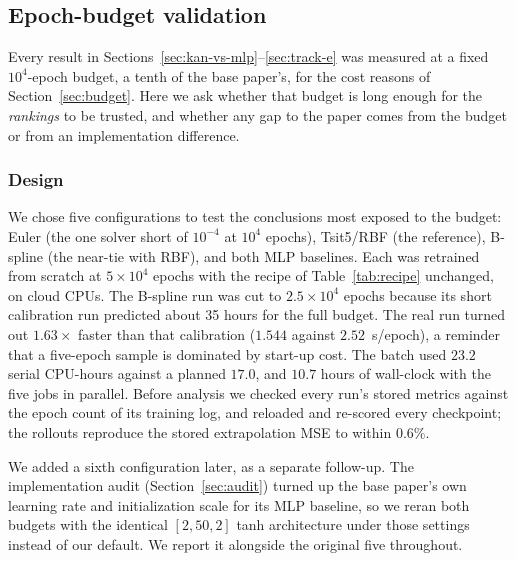 \subsection{Epoch-budget validation}
\label{sec:phase4}

Every result in Sections~\ref{sec:kan-vs-mlp}--\ref{sec:track-e} was measured
at a fixed $10^4$-epoch budget, a tenth of the base paper's, for the cost
reasons of Section~\ref{sec:budget}. Here we ask whether that budget is long
enough for the \emph{rankings} to be trusted, and whether any gap to the
paper comes from the budget or from an implementation difference.

\begin{expectbox}
\end{expectbox}

\subsubsection{Design}

We chose five configurations to test the conclusions most exposed to the
budget: Euler (the one solver short of $10^{-4}$ at $10^4$ epochs),
Tsit5/RBF (the reference), B-spline (the near-tie with RBF), and both MLP
baselines. Each was retrained from scratch at $5\times10^4$ epochs with the
recipe of Table~\ref{tab:recipe} unchanged, on cloud CPUs. The B-spline run
was cut to $2.5\times10^4$ epochs because its short calibration run
predicted about 35 hours for the full budget. The real run turned out
$1.63\times$ faster than that calibration ($1.544$ against $2.52$~s/epoch),
a reminder that a five-epoch sample is dominated by start-up cost. The batch
used $23.2$ serial CPU-hours against a planned $17.0$, and $10.7$ hours of
wall-clock with the five jobs in parallel. Before analysis we checked every
run's stored metrics against the epoch count of its training log, and
reloaded and re-scored every checkpoint; the rollouts reproduce the stored
extrapolation MSE to within $0.6\%$.

We added a sixth configuration later, as a separate follow-up. The
implementation audit (Section~\ref{sec:audit}) turned up the base paper's own
learning rate and initialization scale for its MLP baseline, so we reran
both budgets with the identical $[2,50,2]$ tanh architecture under those
settings instead of our default. We report it alongside the original five
throughout.

